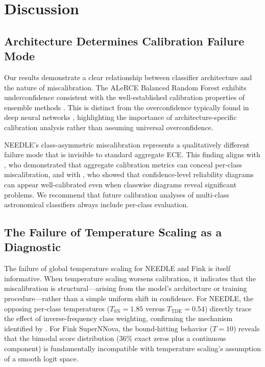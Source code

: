 \documentclass[twocolumn]{aastex631}
\begin{document}
\section{Discussion} \label{sec:discussion}

\subsection{Architecture Determines Calibration Failure Mode}

Our results demonstrate a clear relationship between classifier architecture and the nature of miscalibration. The ALeRCE Balanced Random Forest exhibits underconfidence consistent with the well-established calibration properties of ensemble methods \citep{niculescumizil2005, bostrom2008, loecher2024}. This is distinct from the overconfidence typically found in deep neural networks \citep{guo2017}, highlighting the importance of architecture-specific calibration analysis rather than assuming universal overconfidence.

NEEDLE's class-asymmetric miscalibration represents a qualitatively different failure mode that is invisible to standard aggregate ECE. This finding aligns with \citet{nixon2019}, who demonstrated that aggregate calibration metrics can conceal per-class miscalibration, and with \citet{kull2019}, who showed that confidence-level reliability diagrams can appear well-calibrated even when classwise diagrams reveal significant problems. We recommend that future calibration analyses of multi-class astronomical classifiers always include per-class evaluation.

\subsection{The Failure of Temperature Scaling as a Diagnostic}

The failure of global temperature scaling for NEEDLE and Fink is itself informative. When temperature scaling worsens calibration, it indicates that the miscalibration is structural---arising from the model's architecture or training procedure---rather than a simple uniform shift in confidence. For NEEDLE, the opposing per-class temperatures ($T_{\text{SN}} = 1.85$ versus $T_{\text{TDE}} = 0.54$) directly trace the effect of inverse-frequency class weighting, confirming the mechanism identified by \citet{vandengoorbergh2022}. For Fink SuperNNova, the bound-hitting behavior ($T = 10$) reveals that the bimodal score distribution (36\% exact zeros plus a continuous component) is fundamentally incompatible with temperature scaling's assumption of a smooth logit space.
\end{document}
